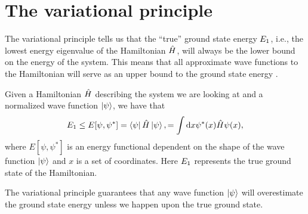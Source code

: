     \section{The variational principle}
        The variational principle tells us that the ``true'' ground state energy
        $E_1$, i.e., the lowest energy eigenvalue of the Hamiltonian
        $\hat{H}$, will always be the lower bound on the energy of the system.
        This means that all approximate wave functions to the Hamiltonian will
        serve as an upper bound to the ground state energy
        \cite{griffiths2017introduction}.
        \begin{theorem}
            Given a Hamiltonian $\hat{H}$ describing the system we are looking
            at and a normalized wave function $\ket{\psi}$, we have that
            \begin{align}
                E_1
                \leq
                E[\psi, \psi^{*}]
                = \bra{\psi}\hat{H}\ket{\psi},
                = \int\dd x\psi^{*}(x)\hat{H}\psi(x),
                \label{eq:variational-principle}
            \end{align}
            where $E[\psi, \psi^{*}]$ is an energy functional dependent on the shape of
            the wave function $\ket{\psi}$ and $x$ is a set of coordinates.
            Here $E_1$ represents the true ground state of the
            Hamiltonian.
        \end{theorem}
        The variational principle guarantees that any wave function $\ket{\psi}$
        will overestimate the ground state energy unless we happen upon the true
        ground state.
